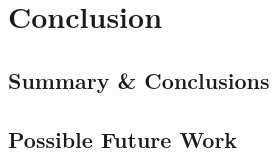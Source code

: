 \chapter{Conclusion \label{sec:conclusion}}

\section{Summary \& Conclusions \label{sec:summary}}
\lipsum[31-33]

\section{Possible Future Work \label{sec:future_work}}
\lipsum[34-36]